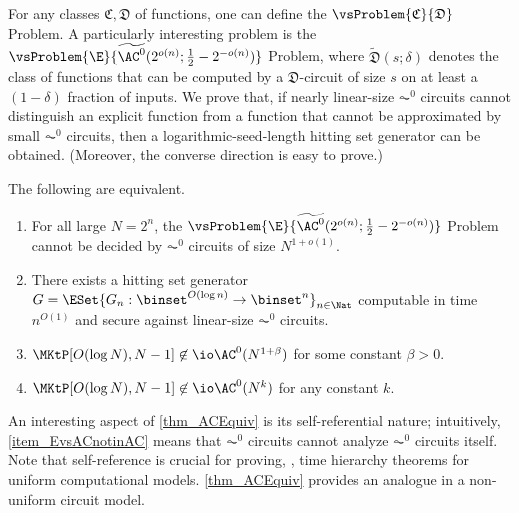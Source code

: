 \documentclass{toc}
\begin{document}
For any classes $\mathfrak{C}, \mathfrak{D}$ of functions,
one can define the $\vsProblem{\mathfrak{C}}{\mathfrak{D}}$ Problem.
A particularly interesting problem is
the $\vsProblem{\E}{\widetilde{\AC^0}(2^{o(n)}; \frac{1}{2} - 2^{- o(n)})}$ Problem,
where $\widetilde{\mathfrak{D}}(s; \delta)$
denotes the class of functions that can be computed by a $\mathfrak{D}$-circuit of size $s$
on at least a $(1 - \delta)$ fraction of inputs.
We prove
that, if nearly linear-size $\AC^0$ circuits cannot distinguish
an explicit function from a function that cannot be approximated by small
$\AC^0$ circuits,
then
a logarithmic-seed-length hitting set generator can be obtained.
(Moreover, the converse direction is easy to prove.)

\begin{theorem}
  \label{thm_ACEquiv}
  The following are equivalent.
  \begin{enumerate}
    \item
          \label{item_EvsACnotinAC}
          For all large $N = 2^n$,
          the $\vsProblem{\E}{\widetilde{\AC^0} (2^{o( n)} ; \frac{1}{2} - 2^{- o(n)})}$ Problem
          cannot be decided by $\AC^0$ circuits of size $N^{1 + o(1)}$.
    \item
          \label{item_AC0HSG}
          There exists a hitting set generator $G = \ESet{ G_n : \binset^{O(\log n)} \to \binset^n }_{n \in \Nat} $ computable in time $n^{O(1)}$ and secure against linear-size $\AC^0$ circuits.
    \item
          \label{item_MKtPnotinlinearAC}
          $\MKtP[O(\log N), N - 1] \not\in \io \AC^0(N^{1 + \beta})$ for some constant $\beta > 0$.
    \item
          \label{item_MKtPnotinAC}
          $\MKtP[O(\log N), N - 1] \not\in \io \AC^0(N^{k})$ for any constant $k$.
  \end{enumerate}
\end{theorem}

%
%
%
%
%
%
%
%
%
%
%
%
%

An interesting aspect of \cref{thm_ACEquiv} is its self-referential nature; intuitively, \cref{item_EvsACnotinAC} means that $\AC^0$ circuits cannot
analyze $\AC^0$ circuits itself.  Note that self-reference is crucial for proving, \eg, time hierarchy theorems for uniform computational models.  \cref{thm_ACEquiv} provides an analogue in a non-uniform circuit model.
\end{document}
